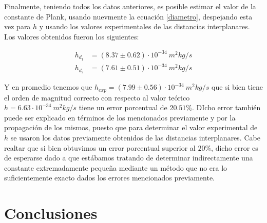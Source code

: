 \documentclass[prb,aps,twocolumn,preprintnumbers,amsmath,amssymb]{revtex4}
\begin{document}
Finalmente, teniendo todos los datos anteriores, es posible estimar el valor de la constante de Plank, usando nuevmente la ecuación \eqref{diametro}, despejando esta vez para $h$ y usando los valores experimentales de las distancias interplanares. Los valores obtenidos fueron los siguientes:

\begin{equation}
\label{lissa}
\begin{split}
h_{d_{1}} &= (8.37 \pm 0.62) \cdot 10^{-34}\ m^2kg/s\\
h_{d_{2}} &= (7.61 \pm 0.51) \cdot 10^{-34}\ m^2kg/s
\end{split}
\end{equation}

Y en promedio tenemos que $h_{exp} = (7.99 \pm 0.56) \cdot 10^{-34}\ m^2kg/s$ que si bien tiene el orden de magnitud correcto con respecto al valor teórico $h = 6.63 \cdot 10^{-34}\ m^2kg/s$ tiene un error porcentual de $20.51\%$. DIcho error también puede ser explicado en términos de los mencionados previamente y por la propagación de los mismos, puesto que para determinar el valor experimental de $h$ se usaron los datos previamente obtenidos de las distancias interplanares. Cabe realtar que si bien obtuvimos un error porcentual superior al $20\%$, dicho error es de esperarse dado a que estábamos tratando de determinar indirectamente una constante extremadamente pequeña mediante un método que no era lo suficientemente exacto dados los errores mencionados previamente.

\section{Conclusiones}
\end{document}
